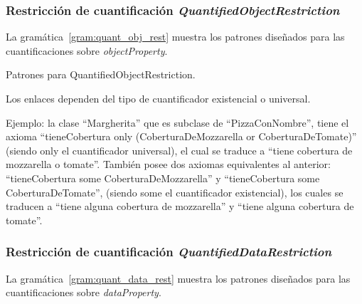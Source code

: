 \subsubsection{Restricción de cuantificación \emph{QuantifiedObjectRestriction}}
La gramática~\ref{gram:quant_obj_rest} muestra los patrones diseñados para las cuantificaciones sobre \emph{objectProperty}.

\begin{GrammarEnv}
\begin{grammar}
\end{grammar}
\caption{Patrones para QuantifiedObjectRestriction.}\label{gram:quant_obj_rest}
\end{GrammarEnv}

Los enlaces dependen del tipo de cuantificador existencial o universal.

Ejemplo: la clase ``Margherita'' que es subclase de ``PizzaConNombre'', tiene el axioma ``tieneCobertura only 
    (CoberturaDeMozzarella or CoberturaDeTomate)'' (siendo only el cuantificador universal), el cual se traduce a ``tiene cobertura de mozzarella o tomate''. También posee dos axiomas equivalentes al anterior: ``tieneCobertura some CoberturaDeMozzarella'' y ``tieneCobertura some CoberturaDeTomate'', (siendo some el cuantificador existencial), los cuales se traducen a ``tiene alguna cobertura de mozzarella'' y ``tiene alguna cobertura de tomate''.


\subsubsection{Restricción de cuantificación \emph{QuantifiedDataRestriction}}
La gramática~\ref{gram:quant_data_rest} muestra los patrones diseñados para las cuantificaciones sobre \emph{dataProperty}.

